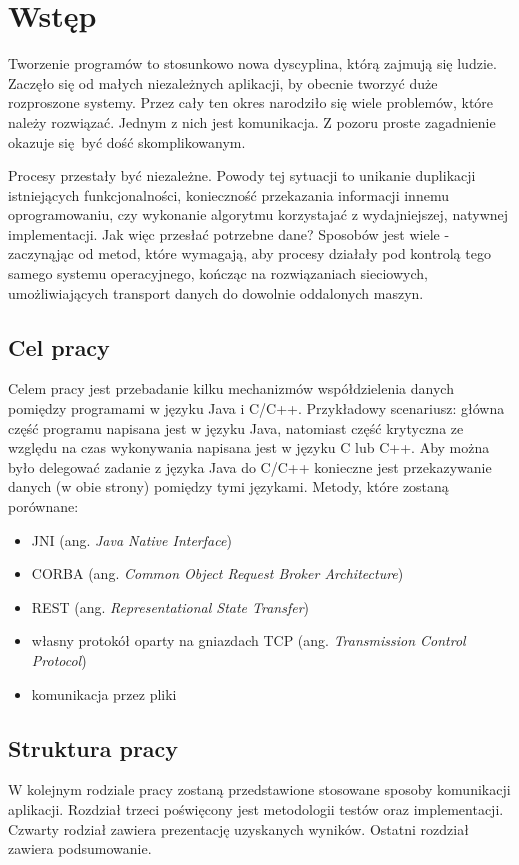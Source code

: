\chapter{Wstęp}

Tworzenie programów to stosunkowo nowa dyscyplina, którą zajmują się ludzie. Zaczęło się od małych niezależnych aplikacji, by obecnie tworzyć duże rozproszone systemy. Przez cały ten okres narodziło się wiele problemów, które należy rozwiązać. Jednym z nich jest komunikacja. Z pozoru proste zagadnienie okazuje się być dość skomplikowanym.

Procesy przestały być niezależne. Powody tej sytuacji to unikanie duplikacji istniejących funkcjonalności, konieczność przekazania informacji innemu oprogramowaniu, czy wykonanie algorytmu korzystajać z wydajniejszej, natywnej implementacji. Jak więc przesłać potrzebne dane? Sposobów jest wiele - zaczynąjąc od metod, które wymagają, aby procesy działały pod kontrolą tego samego systemu operacyjnego, kończąc na rozwiązaniach sieciowych, umożliwiających transport danych do dowolnie oddalonych maszyn.


\section{Cel pracy}

Celem pracy jest przebadanie kilku mechanizmów współdzielenia  danych pomiędzy programami w języku Java i C/C++. 
Przykładowy scenariusz: główna część programu napisana jest w języku Java, natomiast część krytyczna ze względu na czas wykonywania napisana jest w języku C lub C++. Aby można było delegować zadanie z języka Java do C/C++ konieczne jest przekazywanie danych (w obie strony) pomiędzy tymi językami. Metody, które zostaną porównane:
\begin{itemize}
	\item JNI (ang. \textit{Java Native Interface})
	\item CORBA (ang. \textit{Common Object Request Broker Architecture})
	\item REST (ang. \textit{Representational State Transfer})
	\item własny protokół oparty na gniazdach TCP (ang. \textit{Transmission Control Protocol})
	\item komunikacja przez pliki
\end{itemize}


\section{Struktura pracy}

W kolejnym rodziale pracy zostaną przedstawione stosowane sposoby komunikacji aplikacji.
Rozdział trzeci poświęcony jest metodologii testów oraz implementacji.
Czwarty rodział zawiera prezentację uzyskanych wyników.
Ostatni rozdział zawiera podsumowanie.
